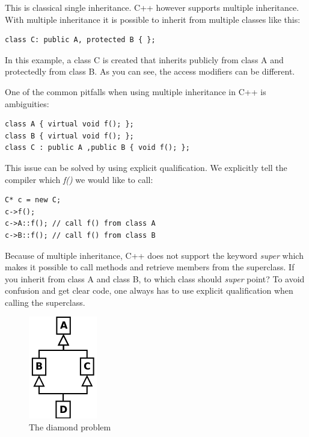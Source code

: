 \documentclass[10pt,a4paper,twocolumn]{article}
\begin{document}
This is classical single inheritance. C++ however supports multiple inheritance. With multiple inheritance it is possible to inherit from multiple classes like this:

\begin{lstlisting}
class C: public A, protected B { };
\end{lstlisting}

In this example, a class C is created that inherits publicly from class A and protectedly from class B. As you can see, the access modifiers can be different. 

One of the common pitfalls when using multiple inheritance in C++ is ambiguities:

\begin{lstlisting}
class A { virtual void f(); };
class B { virtual void f(); };
class C : public A ,public B { void f(); };
\end{lstlisting}

This issue can be solved by using explicit qualification. We explicitly tell the compiler which \textit{f()} we would like to call:

\begin{lstlisting}
C* c = new C;
c->f();
c->A::f(); // call f() from class A
c->B::f(); // call f() from class B
\end{lstlisting}

Because of multiple inheritance, C++ does not support the keyword \textit{super} which makes it possible to call methods and retrieve members from the superclass. If you inherit from class A and class B, to which class should \textit{super} point? To avoid confusion and get clear code, one always has to use explicit qualification when calling the superclass.

\begin{figure}
\caption{The diamond problem}
\begin{center}
\includegraphics[scale=0.6]{diamond.png}
\end{center}
\end{figure}
\end{document}

